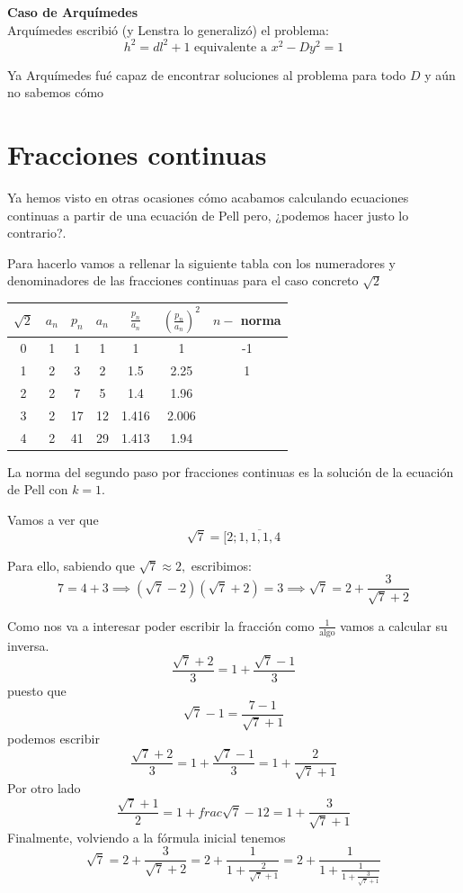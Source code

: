\documentclass{apuntes}
\begin{document}
\begin{mdframed}
\textbf{Caso de Arquímedes}\\

Arquímedes escribió (y Lenstra lo generalizó) el problema:
\[h^2=dl^2+1 \text{ equivalente a } x^2-Dy^2 = 1\]

Ya Arquímedes fué capaz de encontrar soluciones al problema para todo $D$ y aún no sabemos cómo
\end{mdframed}

\section{Fracciones continuas}
Ya hemos visto en otras ocasiones cómo acabamos calculando ecuaciones continuas a partir de una ecuación de Pell pero, ¿podemos hacer justo lo contrario?.

Para hacerlo vamos a rellenar la siguiente tabla con los numeradores y denominadores de las fracciones continuas para el caso concreto $\sqrt{2}$

\begin{center}
\begin{tabular}{|c|c|c|c|c|c|c|}
\hline
$\sqrt{2}$ & $a_n$  & $p_n$ & $a_n$ & $\frac{p_n}{a_n}$ & $\left(\frac{p_n}{a_n}\right)^2$ & $n-$ norma \\
\hline
\hline
0 & 1 & 1 & 1 & 1 & 1 & -1 \\
\hline
1 & 2 & 3 & 2 & 1.5 & 2.25  & 1 \\
\hline
2 & 2 & 7 & 5 & 1.4 & 1.96 & \\
\hline
3 & 2 & 17 & 12 & 1.416 & 2.006 & \\
\hline
4 & 2 & 41 & 29 & 1.413 & 1.94 & \\
\hline
\end{tabular}
\end{center}

La norma del segundo paso por fracciones continuas es la solución de la ecuación de Pell con $k=1$.

\begin{example}
Vamos a ver que
\[\sqrt{7} = [2; \overline{1,1,1,4}\]

Para ello, sabiendo que $\sqrt{7} \approx 2,$ escribimos:
\[7 =4+3 \implies (\sqrt{7}-2)(\sqrt{7}+2) = 3 \implies \sqrt{7} = 2+\frac{3}{\sqrt{7}+2}\]

Como nos va a interesar poder escribir la fracción como $\frac{1}{\text{algo}}$ vamos a calcular su inversa.
\[\frac{\sqrt{7}+2}{3} = 1 +\frac{\sqrt{7}-1}{3}\]
puesto que
\[\sqrt{7}-1 = \frac{7-1}{\sqrt{7}+1}\]
podemos escribir
\[\frac{\sqrt{7}+2}{3} = 1 +\frac{\sqrt{7}-1}{3} = 1 +\frac{2}{\sqrt{7}+1}\]
Por otro lado
\[\frac{\sqrt{7}+1}{2} = 1+frac{\sqrt{7}-1}{2} = 1+\frac{3}{\sqrt{7}+1}\]
Finalmente, volviendo a la fórmula inicial tenemos
\[\sqrt{7} =  2+\frac{3}{\sqrt{7}+2} = 2+ \frac{1}{1+\frac{2}{\sqrt{7}+1}}=2+\frac{1}{1+\frac{1}{1+\frac{3}{\sqrt{7}+1}}}\]
\end{example}
\end{document}
